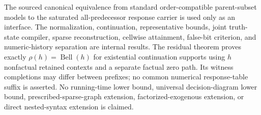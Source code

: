 \documentclass{article}
\begin{document}
The sourced canonical equivalence from standard order-compatible parent-subset models to the saturated all-predecessor response carrier is used only as an interface. The normalization, continuation, representative bounds, joint truth-state compiler, sparse reconstruction, cellwise attainment, false-bit criterion, and numeric-history separation are internal results. The residual theorem proves exactly \(\rho(h)=\operatorname{Bell}(h)\) for existential continuation supports using \(h\) nonfactual retained contexts and a separate factual zero path. Its witness completions may differ between prefixes; no common numerical response-table suffix is asserted. No running-time lower bound, universal decision-diagram lower bound, prescribed-sparse-graph extension, factorized-exogenous extension, or direct nested-syntax extension is claimed.
\end{document}
